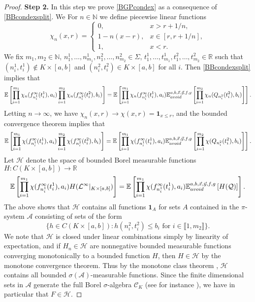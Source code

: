 \begin{proof}
	\noindent\textbf{Step 2. } In this step we prove \eqref{BGPcondex} as a consequence of \eqref{BBcondexsplit}. We For $n\in\mathbb{N}$ we define piecewise linear functions
	\[
	\chi_n(x,r) = \begin{cases}
		0, & x > r + 1/n,\\
		1-n(x-r), & x\in[r,r+1/n],\\
		1, & x < r.
	\end{cases}
	\]
	We fix $m_1,m_2\in\mathbb{N}$, $n^1_1,\dots,n^1_{m_1},n^2_1,\dots,n^2_{m_2}\in\Sigma$, $t^1_1,\dots,t^1_{m_1},t^2_1,\dots,t^2_{m_2}\in\mathbb{R}$ such that $(n^1_i,t^1_i)\notin K\times[a,b]$ and $(n^2_i,t^2_i)\in K\times[a,b]$ for all $i$. Then \eqref{BBcondexsplit} implies that
	\[
	\mathbb{E}\left[\prod_{i=1}^{m_1} \chi_n(f_{n_i^1}^\infty(t_i^1),a_i)\prod_{i=1}^{m_2}\chi_n(f_{n_i^2}^\infty(t_i^2),b_i)\right] = \mathbb{E}\left[\prod_{i=1}^{m_1} \chi_n(f_{n_i^1}^\infty(t_i^1),a_i)\mathbb{E}^{a,b,\vec{x},\vec{y},f,g}_{avoid}\left[\prod_{i=1}^{m_2} \chi_n(Q_{n_i^2}(t_i^2),b_i)\right]\right].
	\]
	Letting $n\to\infty$, we have $\chi_n(x,r)\to \chi(x,r)=\mathbf{1}_{x\leq r}$, and the bounded convergence theorem implies that
	\[
	\mathbb{E}\left[\prod_{i=1}^{m_1} \chi(f_{n_i^1}^\infty(t_i^1),a_i)\prod_{i=1}^{m_2}\chi(f_{n_i^2}^\infty(t_i^2),b_i)\right] = \mathbb{E}\left[\prod_{i=1}^{m_1} \chi(f_{n_i^1}^\infty(t_i^1),a_i)\mathbb{E}^{a,b,\vec{x},\vec{y},f,g}_{avoid}\left[\prod_{i=1}^{m_2} \chi(Q_{n_i^2}(t_i^2),b_i)\right]\right].
	\]
	Let $\mathcal{H}$ denote the space of bounded Borel measurable functions $H:C(K\times[a,b])\to\mathbb{R}$
	\begin{equation}\label{BGPH}
		\mathbb{E}\left[\prod_{i=1}^{m_1} \chi(f_{n_i^1}^\infty(t_i^1),a_i)H(\mathcal{L}^\infty|_{K\times[a,b]})\right] = \mathbb{E}\left[\prod_{i=1}^{m_1} \chi(f_{n_i^1}^\infty(t_i^1),a_i)\mathbb{E}^{a,b,\vec{x},\vec{y},f,g}_{avoid}\left[H(\mathcal{Q})\right]\right].
	\end{equation}
	The above shows that $\mathcal{H}$ contains all functions $\mathbf{1}_A$ for sets $A$ contained in the $\pi$-system $\mathcal{A}$ consisting of sets of the form
	\[
	\{h\in C(K\times[a,b]) : h(n_i^2,t_i^2) \leq b_i \mbox{ for } i\in\llbracket 1,m_2\rrbracket\}.
	\]
	We note that $\mathcal{H}$ is closed under linear combinations simply by linearity of expectation, and if $H_n\in\mathcal{H}$ are nonnegative bounded measurable functions converging monotonically to a bounded function $H$, then $H\in\mathcal{H}$ by the monotone convergence theorem. Thus by the monotone class theorem \cite[Theorem 5.2.2]{Durrett}, $\mathcal{H}$ contains all bounded $\sigma(\mathcal{A})$-measurable functions. Since the finite dimensional sets in $\mathcal{A}$ generate the full Borel $\sigma$-algebra $\mathcal{C}_K$ (see for instance \cite[Lemma 3.1]{DimMat}), we have in particular that $F\in\mathcal{H}$.
	

\end{proof}
